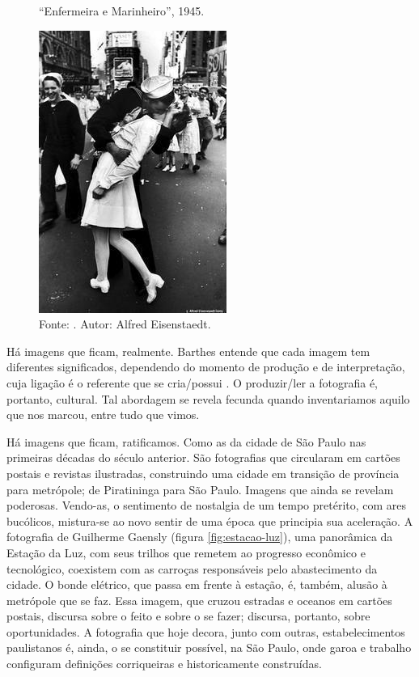 \begin{refsection}
    \begin{figure}[ht]%
        \centering%
        \caption{``Enfermeira e Marinheiro'', 1945.}%
        \includegraphics[width=.50\textwidth]{articles/15-cidade-em-mapas-text/enfermeira-marinheiro.jpeg}%
        \caption*{Fonte: \textcite[p.~90]{Berman2009Seculo}. Autor: Alfred Eisenstaedt.}%
        \label{fig:enfermeira-marinheiro}%
    \end{figure}%

    Há imagens que ficam, realmente. Barthes entende que cada imagem tem diferentes significados, dependendo do momento de produção e de interpretação, cuja ligação é o referente que se cria/possui \cite{Barthes2015Camera}. O produzir/ler a fotografia é, portanto, cultural. Tal abordagem se revela fecunda quando inventariamos aquilo que nos marcou, entre tudo que vimos. 

    Há imagens que ficam, ratificamos. Como as da cidade de São Paulo nas primeiras décadas do século anterior. São fotografias que circularam em cartões postais e revistas ilustradas, construindo uma cidade em transição de província para metrópole; de Piratininga para São Paulo. Imagens que ainda se revelam poderosas. Vendo-as, o sentimento de nostalgia de um tempo pretérito, com ares bucólicos, mistura-se ao novo sentir de uma época que principia sua aceleração. A fotografia de Guilherme Gaensly (figura \ref{fig:estacao-luz}), uma panorâmica da Estação da Luz, com seus trilhos que remetem ao progresso econômico e tecnológico, coexistem com as carroças responsáveis pelo abastecimento da cidade. O bonde elétrico, que passa em frente à estação, é, também, alusão à metrópole que se faz. Essa imagem, que cruzou estradas e oceanos em cartões postais, discursa sobre o feito e sobre o se fazer; discursa, portanto, sobre oportunidades. A fotografia que hoje decora, junto com outras, estabelecimentos paulistanos é, ainda, o se constituir possível, na São Paulo, onde garoa e trabalho configuram definições corriqueiras e historicamente construídas.


\end{refsection}
